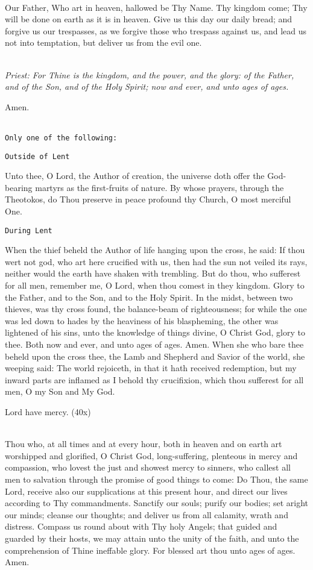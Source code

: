 {\mbox{}\\
Our Father, Who art in heaven, hallowed be Thy Name. Thy kingdom come; 
Thy will be done on earth as it is in heaven. Give us this day our daily bread; 
and forgive us our trespasses,
as we forgive those who trespass against us,
and lead us not into temptation,
but deliver us from the evil one.

\mbox{}\\
\emph{Priest: For Thine is the kingdom, and the power, and the glory:
of the Father, and of the Son, and of the Holy Spirit;
now and ever, and unto ages of ages.} 

Amen. 

\mbox{}\\
\texttt{Only one of the following:}

\texttt{Outside of Lent}

Unto thee, O Lord, the Author of creation, the universe doth offer the God-bearing 
martyrs as the first-fruits of nature. By whose prayers, through the Theotokos, do Thou 
preserve in peace profound thy Church, O most merciful One. 



\texttt{During Lent}

When the thief beheld the Author of life hanging upon the cross, he said:
If thou wert not god, who art here crucified with us,
then had the sun not veiled its rays,
neither would the earth have shaken with trembling.
But do thou, who sufferest for all men, remember me, 
O Lord, when thou comest in they kingdom. 
Glory to the Father, and to the Son, and to the Holy Spirit. 
In the midst, between two thieves, was thy cross found, the balance-beam of 
righteousness; for while the one was led down to hades by the heaviness of his 
blaspheming, the other was lightened of his sins, unto the knowledge of things divine, O 
Christ God, glory to thee. 
Both now and ever, and unto ages of ages. Amen. 
When she who bare thee beheld upon the cross thee, the Lamb and Shepherd and Savior 
of the world, she weeping said: The world rejoiceth, in that it hath received redemption, 
but my inward parts are inflamed as I behold thy crucifixion, which thou sufferest for all 
men, O my Son and My God.


Lord have mercy. (40x)

\mbox{}\\
Thou who, at all times and at every hour, both in heaven and on earth art 
worshipped and glorified, O Christ God, long-suffering, plenteous in mercy 
and compassion, who lovest the just and showest mercy to sinners, who callest 
all men to salvation through the promise of good things to come: Do Thou, the 
same Lord, receive also our supplications at this present hour, and direct our 
lives according to Thy commandments. Sanctify our souls; purify our bodies; 
set aright our minds; cleanse our thoughts; and deliver us from all calamity, 
wrath and distress. Compass us round about with Thy holy Angels; that 
guided and guarded by their hosts, we may attain unto the unity of the faith, 
and unto the comprehension of Thine ineffable glory. For blessed art thou unto 
ages of ages. Amen.

}
